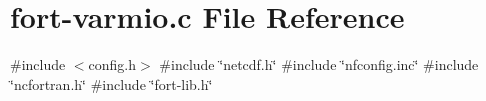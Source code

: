 \hypertarget{fort-varmio_8c}{}\section{fort-\/varmio.c File Reference}
\label{fort-varmio_8c}
{\ttfamily \#include $<$config.\+h$>$}\newline
{\ttfamily \#include \char`\"{}netcdf.\+h\char`\"{}}\newline
{\ttfamily \#include \char`\"{}nfconfig.\+inc\char`\"{}}\newline
{\ttfamily \#include \char`\"{}ncfortran.\+h\char`\"{}}\newline
{\ttfamily \#include \char`\"{}fort-\/lib.\+h\char`\"{}}\newline
